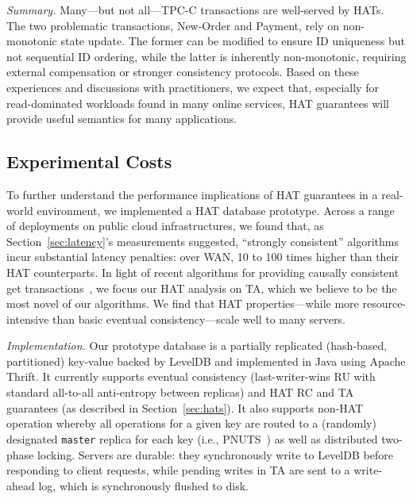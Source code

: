 \vspace{.5em}\noindent\textit{Summary.} Many---but not all---TPC-C
transactions are well-served by HATs. The two problematic
transactions, New-Order and Payment, rely on non-monotonic state
update. The former can be modified to ensure ID uniqueness but not
sequential ID ordering, while the latter is inherently
non-monotonic, requiring external compensation or stronger
consistency protocols. Based on these experiences and discussions with
practitioners, we expect that, especially for read-dominated workloads
found in many online services, HAT guarantees will provide useful
semantics for many applications.

\subsection{Experimental Costs}
\label{sec:prototype}

To further understand the performance implications of HAT guarantees
in a real-world environment, we implemented a HAT database
prototype. Across a range of deployments on public cloud
infrastructures, we found that, as Section~\ref{sec:latency}'s
measurements suggested, ``strongly consistent'' algorithms incur
substantial latency penalties: over WAN, 10 to 100 times higher than
their HAT counterparts. In light of recent algorithms for providing
causally consistent get transactions~\cite{bolton, cops}, we focus our
HAT analysis on TA, which we believe to be the most novel of our
algorithms. We find that HAT properties---while more
resource-intensive than basic eventual consistency---scale well to
many servers.

\vspace{.5em}\noindent\textit{Implementation.} Our prototype database
is a partially replicated (hash-based, partitioned) key-value backed
by LevelDB and implemented in Java using Apache Thrift. It currently
supports eventual consistency (last-writer-wins RU with standard
all-to-all anti-entropy between replicas) and HAT RC and TA guarantees
(as described in Section~\ref{sec:hats}). It also supports non-HAT
operation whereby all operations for a given key are routed to a
(randomly) designated \texttt{master} replica for each key (i.e.,
PNUTS~\cite{pnuts}) as well as distributed two-phase locking. Servers
are durable: they synchronously write to LevelDB before responding to
client requests, while pending writes in TA are sent to a write-ahead
log, which is synchronously flushed to disk.

